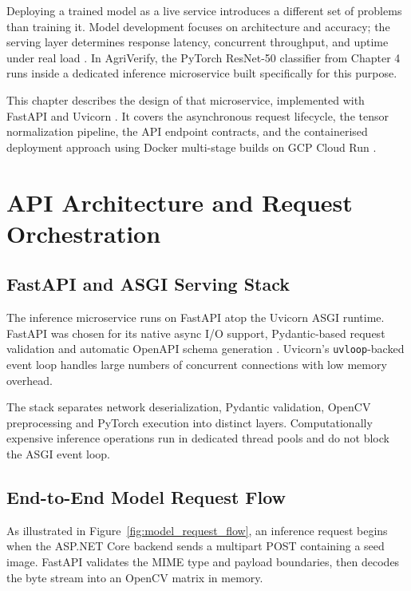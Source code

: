 

Deploying a trained model as a live service introduces a different set of problems than training it. Model development focuses on architecture and accuracy; the serving layer determines response latency, concurrent throughput, and uptime under real load \cite{martin2017clean}. In AgriVerify, the PyTorch ResNet-50 classifier from Chapter 4 runs inside a dedicated inference microservice built specifically for this purpose.

This chapter describes the design of that microservice, implemented with FastAPI and Uvicorn \cite{ramirez2023fastapi}. It covers the asynchronous request lifecycle, the tensor normalization pipeline, the API endpoint contracts, and the containerised deployment approach using Docker multi-stage builds on GCP Cloud Run \cite{merkel2014docker}.

\section{API Architecture and Request Orchestration}
\label{sec:api-architecture-overview}

\subsection{FastAPI and ASGI Serving Stack}
The inference microservice runs on FastAPI atop the Uvicorn ASGI runtime. FastAPI was chosen for its native async I/O support, Pydantic-based request validation and automatic OpenAPI schema generation \cite{ramirez2023fastapi}. Uvicorn's \texttt{uvloop}-backed event loop handles large numbers of concurrent connections with low memory overhead.

The stack separates network deserialization, Pydantic validation, OpenCV preprocessing and PyTorch execution into distinct layers. Computationally expensive inference operations run in dedicated thread pools and do not block the ASGI event loop.

\subsection{End-to-End Model Request Flow}
As illustrated in Figure~\ref{fig:model_request_flow}, an inference request begins when the ASP.NET Core backend sends a multipart POST containing a seed image. FastAPI validates the MIME type and payload boundaries, then decodes the byte stream into an OpenCV matrix in memory.

